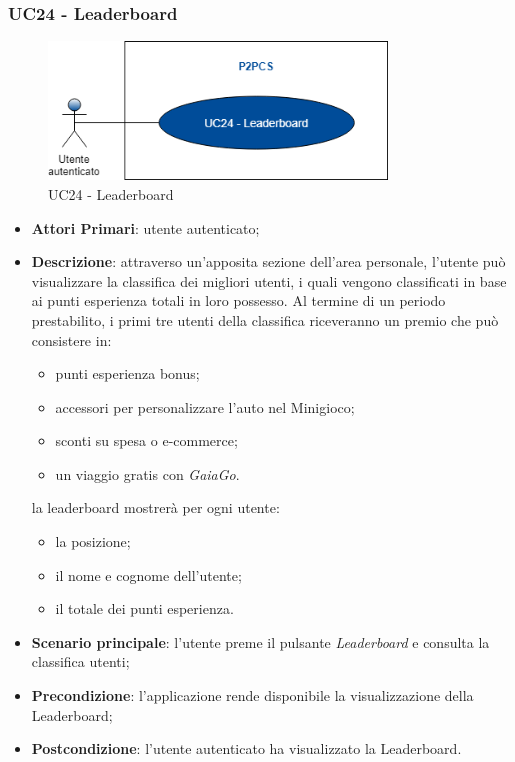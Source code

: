 \subsubsection{UC24 - Leaderboard}
\begin{figure}[h]
	\includegraphics[width=9cm]{res/images/UC22Leaderboard.png}
	\centering
	\caption{UC24 - Leaderboard}
\end{figure}
\begin{itemize}
	\item \textbf{Attori Primari}: utente autenticato;
	\item \textbf{Descrizione}: attraverso un'apposita sezione dell'area personale, l'utente può visualizzare la classifica dei migliori utenti, i quali vengono classificati in base ai punti esperienza totali in loro possesso. Al termine di un periodo prestabilito, i primi tre utenti della classifica riceveranno un premio che può consistere in:
	\begin{itemize}
		\item punti esperienza bonus;
		\item accessori per personalizzare l'auto nel Minigioco;
		\item sconti su spesa o e-commerce;
		\item un viaggio gratis con \textit{GaiaGo}.
	\end{itemize}
	la leaderboard mostrerà per ogni utente:
	\begin{itemize}
		\item la posizione;
		\item il nome e cognome dell'utente;
		\item il totale dei punti esperienza.
	\end{itemize}
	\item \textbf{Scenario principale}: l'utente preme il pulsante \textit{Leaderboard} e consulta la classifica utenti;
	\item \textbf{Precondizione}: l'applicazione rende disponibile la visualizzazione della Leaderboard\glo;
	\item \textbf{Postcondizione}: l'utente autenticato ha visualizzato la Leaderboard.
\end{itemize}

